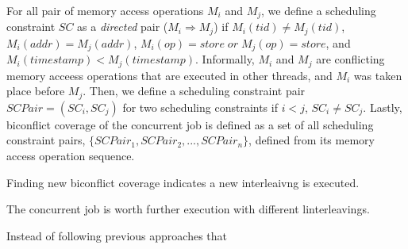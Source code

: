 For all pair of memory access operations $M_i$ and $M_j$, we define a
scheduling constraint $SC$ as a \textit{directed} pair
($M_i \Rightarrow M_j$) if $M_i(tid) \neq M_j(tid)$,
$M_i(addr) = M_j(addr)$, $M_i(op) = store\; or\; M_j(op) = store$, and
$M_i(timestamp) < M_j(timestamp)$.
%
Informally, $M_i$ and $M_j$ are conflicting memory acceess operations
that are executed in other threads, and $M_i$ was taken place before
$M_j$.
%
Then, we define a scheduling constraint pair $SCPair = (SC_i, SC_j)$
for two scheduling constraints if $i < j$, $SC_i \neq SC_j$.
%
%
%
Lastly, biconflict coverage of the concurrent job is defined as a set
of all scheduling constraint pairs,
$\{SCPair_1, SCPair_2, ..., SCPair_n\}$, defined from its memory access
operation sequence.



%
%
Finding new biconflict coverage indicates a new interleaivng is
executed.
%

The concurrent job is worth further execution with different
linterleavings.


Instead of following previous approaches that








